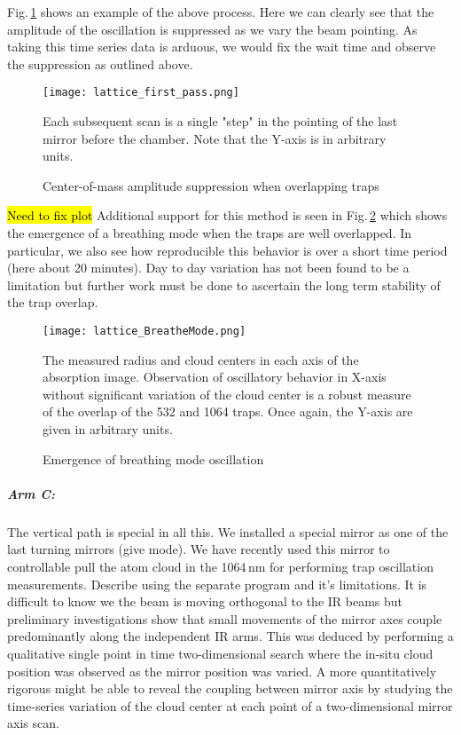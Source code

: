 Fig.\,\ref{fig:latFirtPass} shows an example of the above process.
Here we can clearly see that the amplitude of the oscillation is suppressed as we vary the beam pointing.
As taking this time series data is arduous, we would fix the wait time and observe the suppression as outlined above.
	\begin{figure} 
		\centerline{
		\texttt{[image: lattice\_first\_pass.png]}}
		\caption{Center-of-mass amplitude suppression when overlapping traps}{Each subsequent scan is a single "step" in the pointing of the last mirror before the chamber. Note that the Y-axis is in arbitrary units.}
		\label{fig:latFirtPass}
	\end{figure}
	
\hl{Need to fix plot} Additional support for this method is seen in Fig.\,\ref{fig:latBreatheMode} which shows the emergence of a breathing mode when the traps are well overlapped.
In particular, we also see how reproducible this behavior is over a short time period (here about 20 minutes).
Day to day variation has not been found to be a limitation but further work must be done to ascertain the long term stability of the trap overlap.
	\begin{figure} 
		\centerline{
		\texttt{[image: lattice\_BreatheMode.png]}}
		\caption{Emergence of breathing mode oscillation}{The measured radius and cloud centers in each axis of the absorption image. Observation of oscillatory behavior in X-axis without significant variation of the cloud center is a robust measure of the overlap of the 532 and 1064 traps. Once again, the Y-axis are given in arbitrary units.}
		\label{fig:latBreatheMode}
	\end{figure}
	
\subparagraph{Arm C:} \label{p:armCFirstPas}
The vertical path is special in all this.
We installed a special mirror as one of the last turning mirrors (give mode).
We have recently used this mirror to controllable pull the atom cloud in the 1064\,nm for performing trap oscillation measurements.
Describe using the separate program and it's limitations.
It is difficult to know we the beam is moving orthogonal to the IR beams but preliminary investigations show that small movements of the mirror axes couple predominantly along the independent IR arms.
This was deduced by performing a qualitative single point in time two-dimensional search where the in-situ cloud position was observed as the mirror position was varied.
A more quantitatively rigorous might be able to reveal the coupling between mirror axis by studying the time-series variation of the cloud center at each point of a two-dimensional mirror axis scan.


